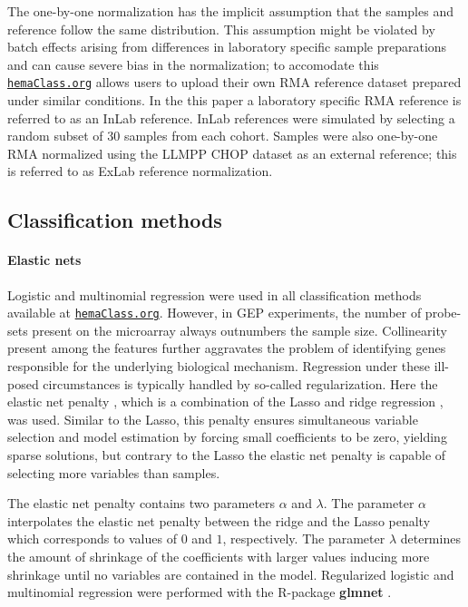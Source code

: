 \documentclass[10pt,letterpaper]{article}
\newcommand{\hemaClass}{\href{http://hemaClass.org}{\texttt{hemaClass.org}}}
\newcommand{\R}{\textsf{R}}
\newcommand{\pkg}[1]{\textbf{#1}}
\begin{document}
The one-by-one normalization has the implicit assumption that the samples and reference follow the same distribution. This assumption might be violated by batch effects arising from differences in laboratory specific sample preparations and can cause severe bias in the normalization; to accomodate this \hemaClass{} allows users to upload their own RMA reference dataset prepared under similar conditions. In the this paper a laboratory specific RMA reference is referred to as an InLab reference. InLab references were simulated by selecting a random subset of 30 samples from each cohort. Samples were also one-by-one RMA normalized using the LLMPP CHOP dataset as an external reference; this is referred to as ExLab reference normalization.

\subsection*{Classification methods}

\paragraph{Elastic nets}
Logistic and multinomial regression were used in all classification methods available at \hemaClass{}.
However, in GEP experiments, the number of probe-sets present on the microarray always outnumbers the sample size.
Collinearity present among the features further aggravates the problem of identifying genes responsible for the underlying biological mechanism.
Regression under these ill-posed circumstances is typically handled by so-called regularization.
Here the elastic net penalty \cite{Friedman2010, Zou2005}, which is a combination of the Lasso \cite{Tibshirani1996} and ridge regression \cite{Hoerl1970}, was used.
Similar to the Lasso, this penalty ensures simultaneous variable selection and model estimation by forcing small coefficients to be zero, yielding sparse solutions,
but contrary to the Lasso the elastic net penalty is capable of selecting more variables than samples.

The elastic net penalty contains two parameters $\alpha$ and $\lambda$.
The parameter $\alpha$ interpolates the elastic net penalty between the ridge and the Lasso penalty which corresponds to values of $0$ and $1$, respectively.
The parameter $\lambda$ determines the amount of shrinkage of the coefficients with larger values inducing more shrinkage until no variables are contained in the model.
Regularized logistic and multinomial regression were performed with the \R{}-package \pkg{glmnet} \cite{Friedman2010}.
\end{document}
